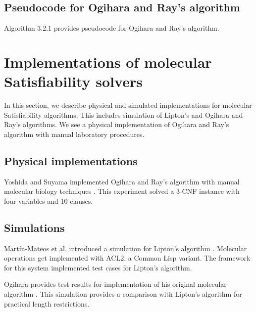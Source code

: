 	\subsection{Pseudocode for Ogihara and Ray's algorithm}

	
Algorithm 3.2.1 provides pseudocode for Ogihara and Ray's algorithm.
	
	
	

	

\section{Implementations of molecular {\sc Satisfiability} solvers}

	In this section, we describe physical and simulated implementations for molecular {\sc Satisfiability} algorithms.  This includes simulation of Lipton's and Ogihara and Ray's algorithms.  We see a physical implementation of Ogihara and Ray's algorithm with manual laboratory procedures.

	\subsection{Physical implementations}
	

Yoshida and Suyama implemented Ogihara and Ray's algorithm with manual molecular biology techniques \cite{dnaBasedImplemetation_Yoshida2000}.  This experiment solved a 3-CNF instance with four variables and 10 clauses.

	
	\subsection{Simulations}

Martín-Mateos et al. introduced a simulation for Lipton's algorithm \cite{MartinMateos02molecularcomputation}.   Molecular operations get implemented with ACL2, a Common Lisp variant.  The framework for this system implemented test cases for Lipton's algorithm.

Ogihara provides test results for implementation of his original molecular algorithm \cite{Ogihara:1996:BFS:898228}.  This simulation provides a comparison with Lipton's algorithm for practical length restrictions.
